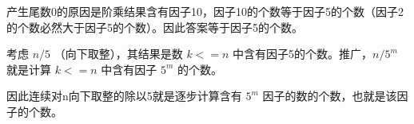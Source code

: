 产生尾数0的原因是阶乘结果含有因子10，因子10的个数等于因子5的个数（因子2的个数必然大于因子5的个数）。因此答案等于因子5的个数。\par

考虑 $n/5$ （向下取整），其结果是数 $k<=n$ 中含有因子5的个数。推广，$n/5^{m}$ 就是计算 $k<=n$ 中含有因子 $5^{m}$ 的个数。\par

因此连续对n向下取整的除以5就是逐步计算含有 $5^{m}$ 因子的数的个数，也就是该因子的个数。\par
